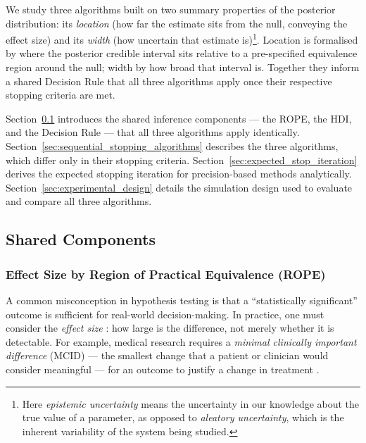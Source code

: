 We study three algorithms built on two summary properties of the posterior
distribution: its \textit{location} (how far the estimate sits from the null,
conveying the effect size) and its \textit{width} (how uncertain that estimate
is)\footnote{Here \textit{epistemic uncertainty} means the uncertainty in our
knowledge about the true value of a parameter, as opposed to
\textit{aleatory uncertainty}, which is the inherent variability of the system
being studied.}.
Location is formalised by where the posterior credible interval sits relative to a
pre-specified equivalence region around the null; width by how broad that interval is.
Together they inform a shared Decision Rule that all three algorithms apply once
their respective stopping criteria are met.

Section~\ref{sec:shared_components} introduces the shared inference components ---
the ROPE, the HDI, and the Decision Rule --- that all three algorithms apply
identically.
Section~\ref{sec:sequential_stopping_algorithms} describes the three algorithms,
which differ only in their stopping criteria.
Section~\ref{sec:expected_stop_iteration} derives the expected stopping iteration for
precision-based methods analytically.
Section~\ref{sec:experimental_design} details the simulation design used to evaluate
and compare all three algorithms.

\subsection{Shared Components}\label{sec:shared_components}

\subsubsection{Effect Size by Region of Practical Equivalence (ROPE)}\label{sec:rope}

A common misconception in hypothesis testing is that a ``statistically significant'' outcome is sufficient for real-world decision-making. In practice, one must consider the \textit{effect size} \citep{cohen1988}: how large is the difference, not merely whether it is detectable. For example, medical research requires a \textit{minimal clinically important difference} (MCID) --- the smallest change that a patient or clinician would consider meaningful --- for an outcome to justify a change in treatment \citep{jaeschke1989}.
%

